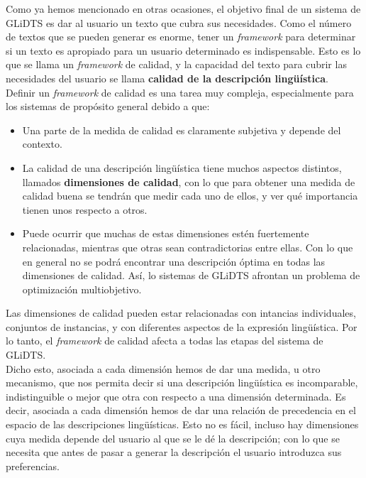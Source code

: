 \documentclass[10pt,a4paper]{article}
\begin{document}
Como ya hemos mencionado en otras ocasiones, el objetivo final de un sistema de GLiDTS es dar al usuario un texto que cubra sus necesidades. Como el número de textos que se pueden generar es enorme, tener un \textit{framework} para determinar si un texto es apropiado para un usuario determinado es indispensable. Esto es lo que se llama un \textit{framework} de calidad, y la capacidad del texto para cubrir las necesidades del usuario se llama \textbf{calidad de la descripción lingüística}.\\

Definir un \textit{framework} de calidad es una tarea muy compleja, especialmente para los sistemas de propósito general debido a que:

\begin{itemize}
\item Una parte de la medida de calidad es claramente subjetiva y depende del contexto.
\item La calidad de una descripción lingüística tiene muchos aspectos distintos, llamados \textbf{dimensiones de calidad}, con lo que para obtener una medida de calidad buena se tendrán que medir cada uno de ellos, y ver qué importancia tienen unos respecto a otros.
\item Puede ocurrir que muchas de estas dimensiones estén fuertemente relacionadas, mientras que otras sean contradictorias entre ellas. Con lo que en general no se podrá encontrar una descripción óptima en todas las dimensiones de calidad. Así, lo sistemas de GLiDTS afrontan un problema de optimización multiobjetivo.
\end{itemize}

Las dimensiones de calidad pueden estar relacionadas con intancias individuales, conjuntos de instancias, y con diferentes aspectos de la expresión lingüística. Por lo tanto, el \textit{framework} de calidad afecta a todas las etapas del sistema de GLiDTS.\\

Dicho esto, asociada a cada dimensión hemos de dar una medida, u otro mecanismo, que nos permita decir si una descripción lingüística es incomparable, indistinguible o mejor que otra con respecto a una dimensión determinada. Es decir, asociada a cada dimensión hemos de dar una relación de precedencia en el espacio de las descripciones lingüísticas. Esto no es fácil, incluso hay dimensiones cuya medida depende del usuario al que se le dé la descripción; con lo que se necesita que antes de pasar a generar la descripción el usuario introduzca sus preferencias.
\end{document}
